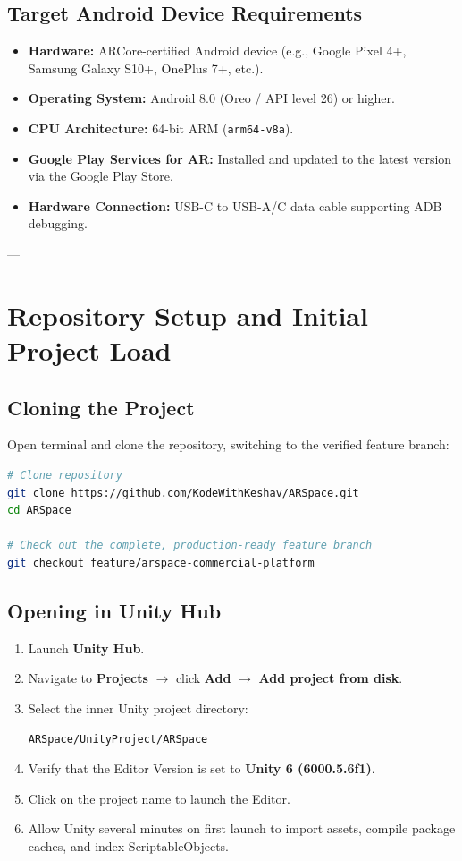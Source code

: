 \documentclass[11pt,a4paper]{article}
\begin{document}
\subsection{Target Android Device Requirements}
\begin{itemize}
    \item \textbf{Hardware:} ARCore-certified Android device (e.g., Google Pixel 4+, Samsung Galaxy S10+, OnePlus 7+, etc.).
    \item \textbf{Operating System:} Android 8.0 (Oreo / API level 26) or higher.
    \item \textbf{CPU Architecture:} 64-bit ARM (\texttt{arm64-v8a}).
    \item \textbf{Google Play Services for AR:} Installed and updated to the latest version via the Google Play Store.
    \item \textbf{Hardware Connection:} USB-C to USB-A/C data cable supporting ADB debugging.
\end{itemize}

---

\section{Repository Setup and Initial Project Load}

\subsection{Cloning the Project}
Open terminal and clone the repository, switching to the verified feature branch:
\begin{lstlisting}[language=bash]
# Clone repository
git clone https://github.com/KodeWithKeshav/ARSpace.git
cd ARSpace

# Check out the complete, production-ready feature branch
git checkout feature/arspace-commercial-platform
\end{lstlisting}

\subsection{Opening in Unity Hub}
\begin{enumerate}
    \item Launch \textbf{Unity Hub}.
    \item Navigate to \textbf{Projects} $\rightarrow$ click \textbf{Add} $\rightarrow$ \textbf{Add project from disk}.
    \item Select the inner Unity project directory:
    \begin{lstlisting}[language=bash]
    ARSpace/UnityProject/ARSpace
    \end{lstlisting}
    \item Verify that the Editor Version is set to \textbf{Unity 6 (6000.5.6f1)}.
    \item Click on the project name to launch the Editor.
    \item Allow Unity several minutes on first launch to import assets, compile package caches, and index ScriptableObjects.
\end{enumerate}
\end{document}
